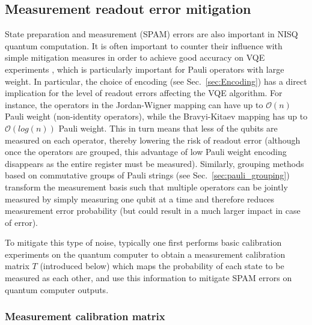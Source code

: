 \subsection{Measurement readout error mitigation}
\label{sec:mit-readout}

State preparation and measurement (SPAM) errors are also important in NISQ quantum computation. It is often important to counter their influence with simple mitigation measures in order to achieve good accuracy on VQE experiments
\cite{kandalaErrorMitigationExtends2019,Kandala2017},
which is particularly important for Pauli operators with large weight. In particular, the choice of encoding (see Sec.~\ref{sec:Encoding}) has a direct implication for the level of readout errors affecting the VQE algorithm. For instance, the operators in the Jordan-Wigner mapping can have up to $\mathcal{O}(n)$ Pauli weight (non-identity operators), while the Bravyi-Kitaev mapping has up to $\mathcal{O}(log(n))$ Pauli weight. This in turn means that less of the qubits are measured on each operator, thereby lowering the risk of readout error \cite{Huggins2021} (although once the operators are grouped, this advantage of low Pauli weight encoding disappears as the entire register must be measured). Similarly, grouping methods based on commutative groups of Pauli strings (see Sec.~\ref{sec:pauli_grouping}) transform the measurement basis such that multiple operators can be jointly measured by simply measuring one qubit at a time and therefore reduces measurement error probability (but could result in a much larger impact in case of error).

To mitigate this type of noise, typically one first performs basic calibration experiments on the quantum computer to obtain a measurement calibration matrix $T$ (introduced below) which maps the probability of each state to be measured as each other, and use this information to mitigate SPAM errors on quantum computer outputs.

\subsubsection{Measurement calibration matrix}

